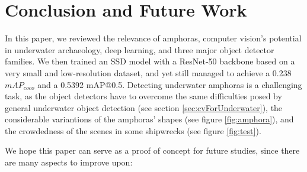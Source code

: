 \documentclass[a4paper, 11pt, oneside]{article}
\begin{document}
  \clearpage

  \section{Conclusion and Future Work}

  In this paper, we reviewed the relevance of amphoras, computer vision's potential in underwater archaeology, deep
  learning, and three major object detector families. We then trained an SSD model with a ResNet-50 backbone
  based on a very small and low-resolution dataset, and yet still managed to achieve a 0.238 $mAP_{coco}$ and a 0.5392
  mAP@0.5. Detecting underwater amphoras is a challenging task, as the object detectors have to overcome the same
  difficulties posed by general underwater object detection (see section \ref{sec:cvForUnderwater}), the considerable
  variantions of the amphoras' shapes (see figure \ref{fig:amphora}), and the crowdedness of the scenes in some
  shipwrecks (see figure \ref{fig:test}).

  We hope this paper can serve as a proof of concept for future studies, since there are many aspects to improve upon:
\end{document}
